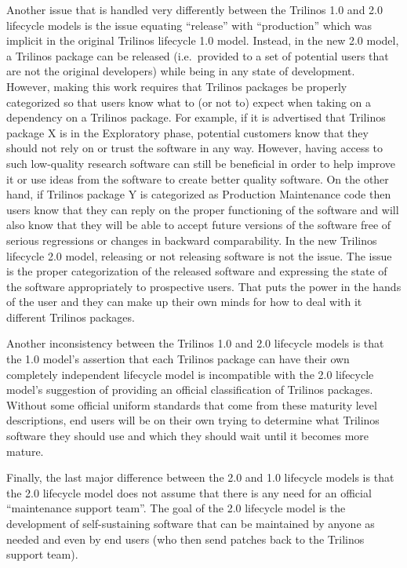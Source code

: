 \documentclass[11pt]{SANDreport}
\begin{document}
Another issue that is handled very differently between the Trilinos
1.0 and 2.0 lifecycle models is the issue equating ``release'' with
``production'' which was implicit in the original Trilinos lifecycle
1.0 model.  Instead, in the new 2.0 model, a Trilinos package can be
released (i.e.\ provided to a set of potential users that are not the
original developers) while being in any state of development.
However, making this work requires that Trilinos packages be properly
categorized so that users know what to (or not to) expect when taking
on a dependency on a Trilinos package.  For example, if it is
advertised that Trilinos package X is in the Exploratory phase,
potential customers know that they should not rely on or trust the
software in any way.  However, having access to such low-quality
research software can still be beneficial in order to help improve it
or use ideas from the software to create better quality software.  On
the other hand, if Trilinos package Y is categorized as Production
Maintenance code then users know that they can reply on the proper
functioning of the software and will also know that they will be able
to accept future versions of the software free of serious regressions
or changes in backward comparability.  In the new Trilinos lifecycle
2.0 model, releasing or not releasing software is not the issue.  The
issue is the proper categorization of the released software and
expressing the state of the software appropriately to prospective
users.  That puts the power in the hands of the user and they can make
up their own minds for how to deal with it different Trilinos
packages.

Another inconsistency between the Trilinos 1.0 and 2.0 lifecycle
models is that the 1.0 model's assertion that each Trilinos package
can have their own completely independent lifecycle model is
incompatible with the 2.0 lifecycle model's suggestion of providing an
official classification of Trilinos packages.  Without some official
uniform standards that come from these maturity level descriptions, end
users will be on their own trying to determine what Trilinos software
they should use and which they should wait until it becomes more
mature.

Finally, the last major difference between the 2.0 and 1.0 lifecycle
models is that the 2.0 lifecycle model does not assume that there is
any need for an official ``maintenance support team''.  The goal of
the 2.0 lifecycle model is the development of self-sustaining software
that can be maintained by anyone as needed and even by end users (who
then send patches back to the Trilinos support team).
\end{document}
